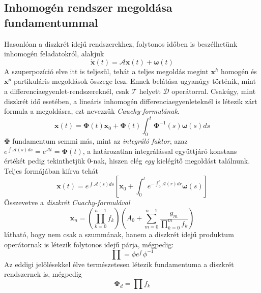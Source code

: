 \documentclass[14p]{article}
\begin{document}
\subsection{Inhomogén rendszer megoldása fundamentummal}
Hasonlóan a diszkrét idejű rendszerekhez, folytonos időben is beszélhetünk inhomogén feladatokról, alakjuk
\[
	\dot{\pmb{x}}(t) = \mathcal{A}\pmb{x}(t) + \pmb{\omega}(t)
\]
A szuperpozíció elve itt is teljesül, tehát a teljes megoldás megint $\pmb{x}^h$ homogén és $\pmb{x}^p$ partikuláris megoldások összege lesz. Ennek belátása ugyanúgy történik, mint a differenciaegyenlet-rendszereknél, csak $\mathcal{T}$ helyett $\mathcal{D}$ operátorral. Csakúgy, mint diszkrét idő esetében, a lineáris inhomogén differenciaegyenleteknél is létezik zárt formula a megoldásra, ezt nevezzük \emph{Cauchy-formulának}.
\[
	\pmb{x}(t) = \mathbf{\Phi}(t)\pmb{x}_0 + \mathbf{\Phi}(t)\int_{0}^{t}{\mathbf{\Phi}^{-1}(s) \pmb{\omega}(s)ds}
\]
$\mathbf{\Phi}$ fundamentum semmi más, mint az \emph{integráló faktor}, azaz $e^{\int{\mathcal{A}(s)ds}} = e^{\mathcal{A}t} = \mathbf{\Phi}(t)$, a határozatlan integrálással együttjáró konstans értékét pedig tekinthetjük $0$-nak, hiszen elég \emph{egy} kielégítő megoldást találnunk. Teljes formájában kiírva tehát
\[
	\pmb{x}(t) = e^{\int{\mathcal{A}(s)ds}}[\pmb{x}_0 + \int_{0}^{t}{e^{-\int_{0}^{s}{\mathcal{A}(r)dr}}}\pmb{\omega}(s)]
\]
Összevetve a \emph{diszkrét Cuachy-formulával}
\[
	\pmb{x}_n = (\prod_{k=0}^{n-1}{f_k})(A_0 + \sum_{m=0}^{n-1}{\frac{g_m}{\prod_{k=0}^{m}{f_k}}})
\]
látható, hogy nem csak a szummának, hanem a diszkrét idejű produktum operátornak is létezik folytonos idejű párja, mégpedig:
\[
	\prod = \phi e^{\int} \phi^{-1}	
\]
Az eddigi jelölésekkel élve természetesen létezik fundamentuma a diszkrét rendszernek is, mégpedig
\[
	\mathbf{\Phi}_d = \prod{f_k}
\]
\end{document}
